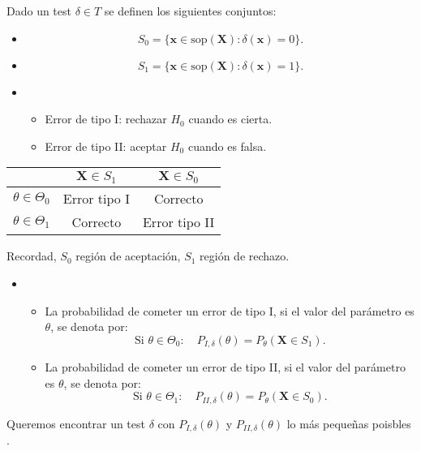 Dado un test $\delta\in T$ se definen los siguientes conjuntos:
\begin{tcolorbox}[colback=blue!5!white, colframe=blue!75!black, title=\textbf{Definición}]
\begin{itemize}[label=\textbullet]
    \item {} \[
            S_0=\{\mathbf{x}\in \mathrm{sop}(\mathbf{X}):\delta(\mathbf{x})=0\} .
    \]  
\item {} \[
S_1=\{\mathbf{x}\in \mathrm{sop}(\mathbf{X}):\delta(\mathbf{x})=1\} .
\]  
\end{itemize}
\end{tcolorbox}
\begin{itemize}[label=\color{red}\textbullet, leftmargin=*]
    \item {}
        \begin{itemize}[label=\textbullet]
            \item Error de tipo I: rechazar $H_0$ cuando es cierta.
            \item Error de tipo II: aceptar $H_0$ cuando es falsa.
        \end{itemize}
\end{itemize}
\begin{tcolorbox}[colback=blue!5!white, colframe=blue!75!black, title=\textbf{Resumen}]
\begin{center}
    \begin{tabular}{ccc}
        & $\mathbf{X}\in S_1$ & $\mathbf{X}\in S_0$ \\ \hline
        $\theta\in \Theta_0$ & Error tipo I & Correcto\\ \hline
        $\theta\in \Theta_1$ & Correcto & Error tipo II
    \end{tabular}
\end{center}
\end{tcolorbox}
Recordad, $S_0$ región de aceptación, $S_1$ región de rechazo.
\begin{itemize}[label=\color{red}\textbullet, leftmargin=*]
    \item {}
        \begin{itemize}[label=\textbullet]
            \item La probabilidad de cometer un error de tipo I, si el valor del parámetro es $\theta$, se denota por:  \[
            \text{Si }\theta\in \Theta_0:\quad P_{I,\delta}(\theta)=P_\theta(\mathbf{X}\in S_1).
            \] 
        \item La probabilidad de cometer un error de tipo II, si el valor del parámetro es $\theta$, se denota por:  \[
        \text{Si }\theta\in \Theta_1:\quad P_{II,\delta}(\theta)=P_\theta(\mathbf{X}\in S_0).
        \] 
        \end{itemize}
\end{itemize}
\begin{tcolorbox}[colback=blue!5!white, colframe=blue!75!black, title=\textbf{¿Qué buscamos?}]
Queremos encontrar un test $\delta$ con  $P_{I,\delta}(\theta)$ y $P_{II,\delta}(\theta)$ lo más pequeñas poisbles .
\end{tcolorbox}
